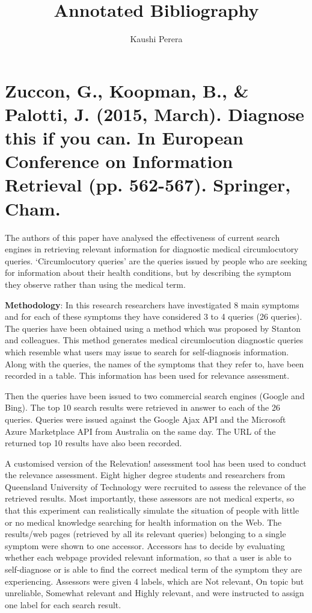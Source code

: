 \documentclass[]{article}
\title{Annotated Bibliography}
\author{Kaushi Perera}
\begin{document}
\maketitle


\section{Zuccon, G., Koopman, B., & Palotti, J. (2015, March). Diagnose this if you can. In European Conference on Information Retrieval (pp. 562-567). Springer, Cham.}

The authors of this paper have analysed the effectiveness of current search engines in retrieving relevant information for diagnostic medical circumlocutory queries. ‘Circumlocutory queries’ are the queries issued by people who are seeking for information about their health conditions, but by describing the symptom they observe rather than using the medical term. 
 
\textbf{Methodology}: In this research researchers have investigated 8 main symptoms and for each of these symptoms they have considered 3 to 4 queries (26 queries). The queries have been obtained using a method which was proposed by Stanton and colleagues. This method generates medical circumlocution diagnostic queries which resemble what users may issue to search for self-diagnosis information. Along with the queries, the names of the symptoms that they refer to, have been recorded in a table. This information has been used for relevance assessment.
 
Then the queries have been issued to two commercial search engines (Google and Bing). The top 10 search results were retrieved in answer to each of the 26 queries. Queries were issued against the Google Ajax API and the Microsoft Azure Marketplace API from Australia on the same day. The URL of the returned top 10 results have also been recorded. 

A customised version of the Relevation! assessment tool has been used to conduct the relevance assessment. Eight higher degree students and researchers from Queensland University of Technology were recruited to assess the relevance of the retrieved results. Most importantly, these assessors are not medical experts, so that this experiment can realistically simulate the situation of people with little or no medical knowledge searching for health information on the Web. The results/web pages (retrieved by all its relevant queries) belonging to a single symptom were shown to one accessor. Accessors has to decide by evaluating whether each webpage provided relevant information, so that a user is able to self-diagnose or is able to find the correct medical term of the symptom they are experiencing. Assessors were given 4 labels, which are Not relevant, On topic but unreliable, Somewhat relevant and Highly relevant, and were instructed to assign one label for each search result. 
\end{document}
